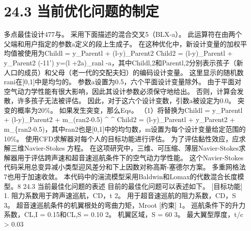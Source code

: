 \documentclass[UTF8,11pt,a4paper,openany,fontset=fandol]{ctexbook}
\begin{document}
\section{24.3 当前优化问题的制定}
多点最佳设计477与。 采用下面描述的混合交叉5（BLX-a）。 此运算符在由两个父端和用户指定的参数a定义的段上生成子。 在这种优化中，新设计变量的加权平均值被使用为Childl = y\_Parentl + (l-y)\_Parent2 Child2 = (l-y)\_Parentl + y\_Parent2 (-11') y=(l +2a)\_ranl -a，其中Childl,2和Parentl,2分别表示孩子（新人口的成员）和父母（老一代的交配夫妇）的编码设计变量。 这里显示的随机数rani在[0,1]中是均匀的。 参数a设置为0.5，六个平面设计变量除外。 由于平面对空气动力学性能有很大影响，因此其设计参数必须保守地给出。 否则，计算会发散，许多孩子无法被评估。 因此，对于这六个设计变数，引数a被设定为0.0。 突变的概率为20\%。 如果发生突变，那么Eqs。 （1）将替换为Childl = y\_Parentl + (l-y)\_Parent2 + m\_(ran2-0.5) \textasciicircum{} \textasciicircum{} Child2 = (l-y)\_Parentl + y\_Parent2 + m\_\{ran2-0.5)，其中ran2也是[0,1]中的均匀数，m设置为每个设计变量给定范围的10\%。 使用CFD求解器对每个人的目标功能进行评估。 为了评估黏性效应，应求解三维Navier-Stokes 方程。 在这项研究中，三维、可压缩、薄层Navier-Stokes求解器用于评估跨声速和超音速巡航条件下的空气动力学性能。 这个Navier-Stokes代码采用总变异减小类型迎风差分和下上因数对称高斯-塞德尔方案。 多重网格法7也用于加速收敛。 本代码中的湍流模型采用Baldwin和Lomax的代数混合长度模型。8 24.3 当前最佳化问题的表述 目前的最佳化问题可以表述如下。 [目标功能] 1. 阻力系数用于跨声速巡航，CD，t 2。 用于超音速巡航的阻力系数，CD，S 3。 超音速巡航条件的机翼根处的弯曲力矩，Mroot [约束] 1。 巡航条件下的升力系数，CL,I = 0.15和CL,S = 0.10 2。 机翼区域，S = 60 3。 最大翼型厚度，t/c > 0.03
\end{document}
